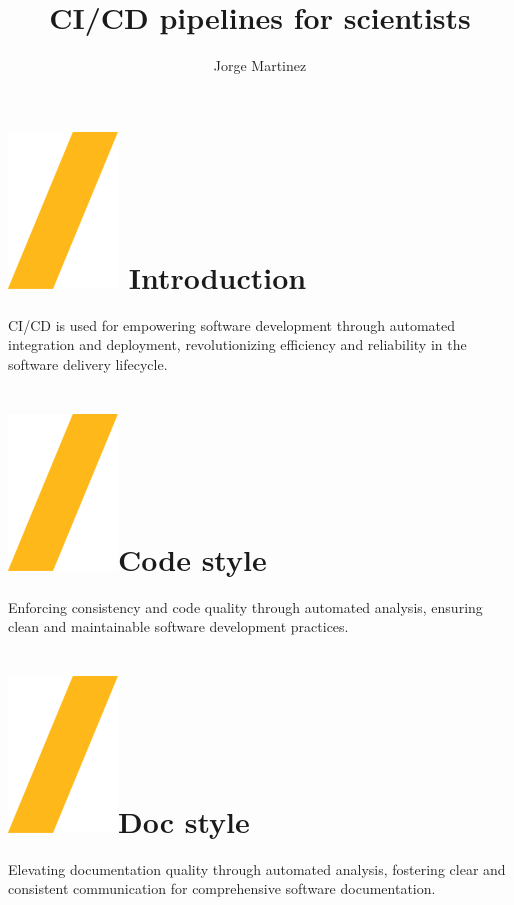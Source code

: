 \documentclass[a0paper,fleqn]{src/betterposter}
\begin{document}
{\title{CI\slash CD pipelines for scientists}
\author{Jorge Martinez}

\section{\includegraphics[height=\fontcharht\font`\S]{img/example/slash.png} Introduction}
CI/CD is used for empowering software development through automated integration
and deployment, revolutionizing efficiency and reliability in the software
delivery lifecycle.

\section{\includegraphics[height=\fontcharht\font`\S]{img/example/slash.png}Code style}
Enforcing consistency and code quality through automated analysis, ensuring
clean and maintainable software development practices.

\section{\includegraphics[height=\fontcharht\font`\S]{img/example/slash.png}Doc style}
Elevating documentation quality through automated analysis, fostering clear and
consistent communication for comprehensive software documentation.

}
\end{document}
